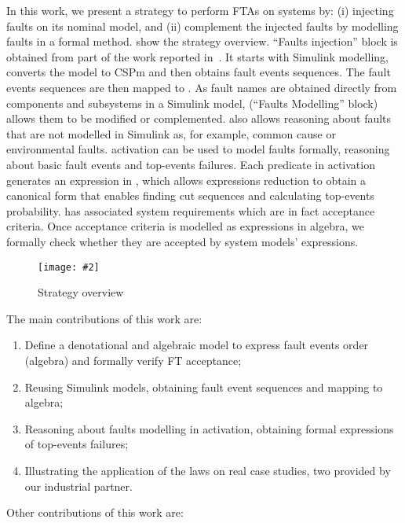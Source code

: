 \documentclass[en,twoside,onehalfspacing,phd]{risethesis}
\newcommand{\includegraphicsaspectratio}[2][1]{%
  \texttt{[image: \#2]}%
}
\newcommand{\simulink}{Simulink\xspace}
\begin{document}
In this work, we present a strategy to perform \aclp{FTA} on systems by: (i) injecting faults on its nominal model, and (ii) complement the injected faults by modelling faults in a formal method.
 show the strategy overview.
``Faults injection'' block is obtained from part of the work reported in~\cite{Didier2012}. 
It starts with \simulink modelling, converts the model to \ac{CSPm} and then obtains fault events sequences.
The fault events sequences are then mapped to .
As fault names are obtained directly from components and subsystems in a Simulink model,  (``Faults Modelling'' block) allows them to be modified or complemented.
 also allows reasoning about faults that are not modelled in Simulink as, for example, common cause or environmental faults.
\Ac{activation} can be used to model faults formally, reasoning about basic fault events and top-events failures.
Each predicate in \ac{activation} generates an expression in , which allows expressions reduction to obtain a canonical form that enables finding cut sequences and calculating top-events probability.
 has associated system requirements which are in fact acceptance criteria.
Once  acceptance criteria is modelled as expressions in \ac{algebra}, we formally check whether they are accepted by system models' expressions.

\begin{figure}[t]
  \centering
  \includegraphicsaspectratio[0.8]{StrategyOverview}
  \caption{Strategy overview}
  \label{fig:strategy-overview}
\end{figure}

The main contributions of this work are:

\begin{enumerate}
  \item Define a denotational and algebraic model to express fault events order (\ac{algebra}) and formally verify \ac{FT} acceptance;
  \item Reusing \simulink models, obtaining fault event sequences and mapping to \ac{algebra};
  \item Reasoning about faults modelling in \ac{activation}, obtaining formal expressions of top-events failures;
  \item Illustrating the application of the laws on real case studies, two provided by our industrial partner.
\end{enumerate}

Other contributions of this work are:
\end{document}
